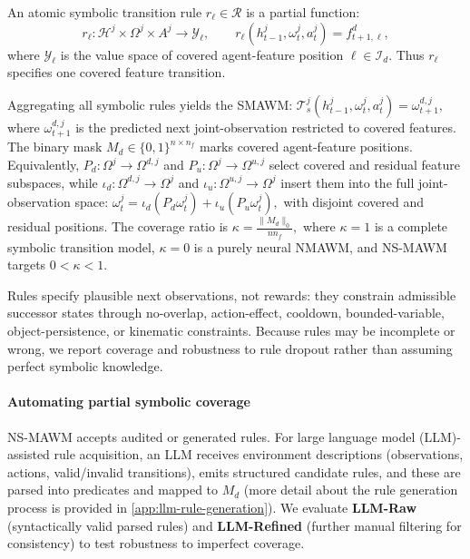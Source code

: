 \documentclass{article}
\theoremstyle{plain}
\theoremstyle{definition}
\theoremstyle{remark}
\begin{document}
An atomic symbolic transition rule $r_\ell \in \mathcal{R}$ is a partial function:
\begin{equation*}
  r_\ell : \mathcal{H}^j \times \Omega^j \times A^j \rightarrow \mathcal{Y}_\ell,
  \qquad
  r_\ell(h^j_{t-1}, \omega^j_t, a^j_t)=f^d_{t+1,\ell},
\end{equation*}
where $\mathcal{Y}_\ell$ is the value space of covered agent-feature position $\ell\in\mathcal{I}_d$. Thus $r_\ell$ specifies one covered feature transition.

Aggregating all symbolic rules yields the SMAWM:
$\mathcal{T}^j_s(h^j_{t-1}, \omega^j_t, a^j_t) = \omega^{d,j}_{t+1},$
where $\omega^{d,j}_{t+1}$ is the predicted next joint-observation restricted to covered features.
The binary mask $M_d \in \{0,1\}^{n \times n_f}$ marks covered agent-feature positions. Equivalently, $P_d:\Omega^j\rightarrow\Omega^{d,j}$ and $P_u:\Omega^j\rightarrow\Omega^{u,j}$ select covered and residual feature subspaces, while $\iota_d:\Omega^{d,j}\rightarrow\Omega^j$ and $\iota_u:\Omega^{u,j}\rightarrow\Omega^j$ insert them into the full joint-observation space:
$
  \omega^j_t = \iota_d(P_d\omega^j_t) + \iota_u(P_u\omega^j_t),
$
with disjoint covered and residual positions. The coverage ratio is
$
  \kappa = \frac{\|M_d\|_0}{n n_f},
$
where $\kappa=1$ is a complete symbolic transition model, $\kappa=0$ is a purely neural NMAWM, and NS-MAWM targets $0<\kappa<1$.

Rules specify plausible next observations, not rewards: they constrain admissible successor states through no-overlap, action-effect, cooldown, bounded-variable, object-persistence, or kinematic constraints. Because rules may be incomplete or wrong, we report coverage and robustness to rule dropout rather than assuming perfect symbolic knowledge.

\paragraph{Automating partial symbolic coverage}
NS-MAWM accepts audited or generated rules. For large language model (LLM)-assisted rule acquisition, an LLM receives environment descriptions (observations, actions, valid/invalid transitions), emits structured candidate rules, and these are parsed into predicates and mapped to $M_d$ (more detail about the rule generation process is provided in \autoref{app:llm-rule-generation}). We evaluate \textbf{LLM-Raw} (syntactically valid parsed rules) and \textbf{LLM-Refined} (further manual filtering for consistency) to test robustness to imperfect coverage.
\end{document}
